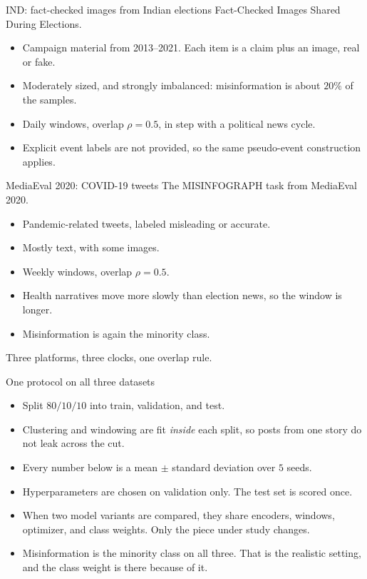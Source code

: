 \begin{frame}{IND: fact-checked images from Indian elections}
  Fact-Checked Images Shared During Elections.
  \vspace{0.55em}
  \begin{itemize}
    \item Campaign material from 2013--2021. Each item is a claim plus an image, real or fake.
    \item Moderately sized, and strongly imbalanced: misinformation is about $20\%$ of the samples.
    \item Daily windows, overlap $\rho=0.5$, in step with a political news cycle.
    \item Explicit event labels are not provided, so the same pseudo-event construction applies.
  \end{itemize}
\end{frame}

\begin{frame}{MediaEval 2020: COVID-19 tweets}
  The MISINFOGRAPH task from MediaEval 2020.
  \vspace{0.55em}
  \begin{itemize}
    \item Pandemic-related tweets, labeled misleading or accurate.
    \item Mostly text, with some images.
    \item Weekly windows, overlap $\rho=0.5$.
    \item Health narratives move more slowly than election news, so the window is longer.
    \item Misinformation is again the minority class.
  \end{itemize}
  \vspace{0.4em}
  Three platforms, three clocks, one overlap rule.
\end{frame}

\begin{frame}{One protocol on all three datasets}
  \begin{itemize}
    \item Split $80/10/10$ into train, validation, and test.
    \item Clustering and windowing are fit \emph{inside} each split, so posts from one story do not leak across the cut.
    \item Every number below is a mean $\pm$ standard deviation over $5$ seeds.
    \item Hyperparameters are chosen on validation only. The test set is scored once.
    \item When two model variants are compared, they share encoders, windows, optimizer, and class weights. Only the piece under study changes.
    \item Misinformation is the minority class on all three. That is the realistic setting, and the class weight is there because of it.
  \end{itemize}
\end{frame}

